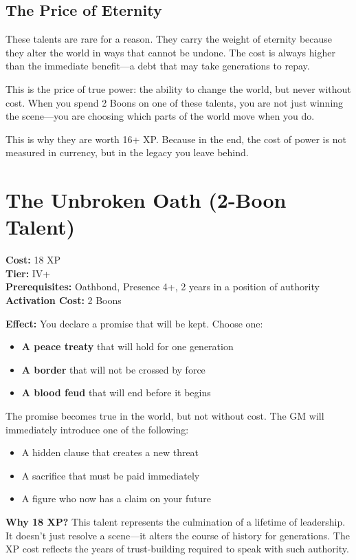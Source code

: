 \documentclass[11pt]{book}
\begin{document}
\subsection{The Price of Eternity}

These talents are rare for a reason. They carry the weight of eternity because they alter the world in ways that cannot be undone. The cost is always higher than the immediate benefit---a debt that may take generations to repay.

This is the price of true power: the ability to change the world, but never without cost. When you spend 2 Boons on one of these talents, you are not just winning the scene---you are choosing which parts of the world move when you do.

This is why they are worth 16+ XP. Because in the end, the cost of power is not measured in currency, but in the legacy you leave behind.
\section{The Unbroken Oath (2-Boon Talent)}
\textbf{Cost:} 18 XP \\
\textbf{Tier:} IV+ \\
\textbf{Prerequisites:} Oathbond, Presence 4+, 2 years in a position of authority \\
\textbf{Activation Cost:} 2 Boons

\textbf{Effect:} You declare a promise that will be kept. Choose one:
\begin{itemize}
  \item \textbf{A peace treaty} that will hold for one generation
  \item \textbf{A border} that will not be crossed by force
  \item \textbf{A blood feud} that will end before it begins
\end{itemize}

The promise becomes true in the world, but not without cost. The GM will immediately introduce one of the following:
\begin{itemize}
  \item A hidden clause that creates a new threat
  \item A sacrifice that must be paid immediately
  \item A figure who now has a claim on your future
\end{itemize}

\textbf{Why 18 XP?} This talent represents the culmination of a lifetime of leadership. It doesn't just resolve a scene---it alters the course of history for generations. The XP cost reflects the years of trust-building required to speak with such authority.
\end{document}
